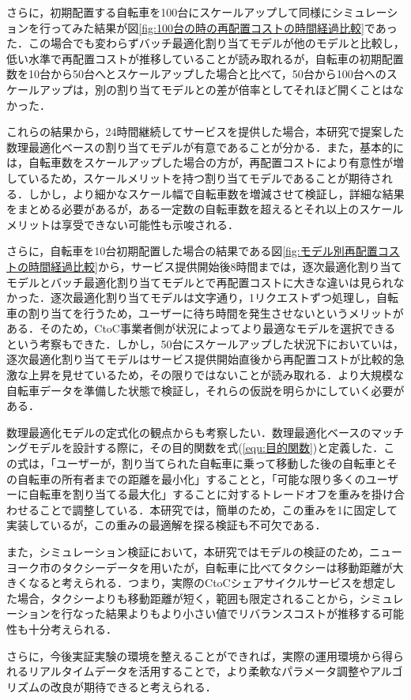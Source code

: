       \par さらに，初期配置する自転車を100台にスケールアップして同様にシミュレーションを行ってみた結果が図\ref{fig:100台の時の再配置コストの時間経過比較}であった．この場合でも変わらずバッチ最適化割り当てモデルが他のモデルと比較し，低い水準で再配置コストが推移していることが読み取れるが，自転車の初期配置数を10台から50台へとスケールアップした場合と比べて，50台から100台へのスケールアップは，別の割り当てモデルとの差が倍率としてそれほど開くことはなかった．
      \par これらの結果から，24時間継続してサービスを提供した場合，本研究で提案した数理最適化ベースの割り当てモデルが有意であることが分かる．また，基本的には，自転車数をスケールアップした場合の方が，再配置コストにより有意性が増しているため，スケールメリットを持つ割り当てモデルであることが期待される．しかし，より細かなスケール幅で自転車数を増減させて検証し，詳細な結果をまとめる必要があるが，ある一定数の自転車数を超えるとそれ以上のスケールメリットは享受できない可能性も示唆される．
      \par さらに，自転車を10台初期配置した場合の結果である図\ref{fig:モデル別再配置コストの時間経過比較}から，サービス提供開始後8時間までは，逐次最適化割り当てモデルとバッチ最適化割り当てモデルとで再配置コストに大きな違いは見られなかった．逐次最適化割り当てモデルは文字通り，1リクエストずつ処理し，自転車の割り当てを行うため，ユーザーに待ち時間を発生させないというメリットがある．そのため，CtoC事業者側が状況によってより最適なモデルを選択できるという考察もできた．しかし，50台にスケールアップした状況下においていは，逐次最適化割り当てモデルはサービス提供開始直後から再配置コストが比較的急激な上昇を見せているため，その限りではないことが読み取れる．より大規模な自転車データを準備した状態で検証し，それらの仮説を明らかにしていく必要がある．
      \par 数理最適化モデルの定式化の観点からも考察したい．数理最適化ベースのマッチングモデルを設計する際に，その目的関数を式(\ref{equ:目的関数})と定義した．この式は，「ユーザーが，割り当てられた自転車に乗って移動した後の自転車とその自転車の所有者までの距離を最小化」することと，「可能な限り多くのユーザーに自転車を割り当てる最大化」することに対するトレードオフを重みを掛け合わせることで調整している．本研究では，簡単のため，この重みを1に固定して実装しているが，この重みの最適解を探る検証も不可欠である．
      \par また，シミュレーション検証において，本研究ではモデルの検証のため，ニューヨーク市のタクシーデータを用いたが，自転車に比べてタクシーは移動距離が大きくなると考えられる．つまり，実際のCtoCシェアサイクルサービスを想定した場合，タクシーよりも移動距離が短く，範囲も限定されることから，シミュレーションを行なった結果よりもより小さい値でリバランスコストが推移する可能性も十分考えられる．
      \par さらに，今後実証実験の環境を整えることができれば，実際の運用環境から得られるリアルタイムデータを活用することで，より柔軟なパラメータ調整やアルゴリズムの改良が期待できると考えられる．
      

